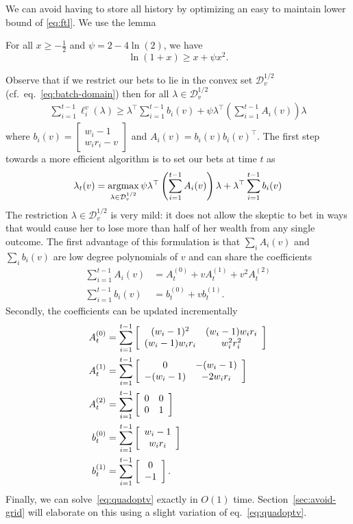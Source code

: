We can avoid having to store all history by optimizing an easy to maintain
lower bound of \eqref{eq:ftl}.  We use the lemma
\begin{lemma} 
\label{lem:quadbound}
For all $x\geq -\frac{1}{2}$ and $\psi=2-4\ln(2)$, we have
\[
\ln(1+x)\geq x + \psi x^2.
\]
\end{lemma}
Observe that if we restrict our bets to lie in the convex set
$\mathcal{D}_v^{1/2}$ (cf.~eq.~\eqref{eq:batch-domain}) then for all $\lambda
\in \mathcal{D}_v^{1/2}$
\begin{align*}
\sum_{i=1}^{t-1} \ell_i^v(\lambda) 
\geq
\lambda^\top \sum_{i=1}^{t-1} b_i(v) 
+\psi \lambda^\top \left(\sum_{i=1}^{t-1} A_i(v)\right) \lambda
\end{align*}
where 
$b_i(v)=
\left[\begin{array}{c} 
w_i-1 \\ w_i r_i -v 
\end{array}\right] 
$
and 
$
A_i(v) = b_i(v)b_i(v)^\top.
$
The first step towards a more efficient algorithm is to set our bets at time
$t$ as
\begin{equation}
\lambda_t(v) = \operatorname*{argmax}_{\lambda \in \mathcal{D}_{v}^{1/2}}
\psi  \lambda^\top \left(\sum_{i=1}^{t-1} A_i(v)\right) \lambda 
+ \lambda^\top \sum_{i=1}^{t-1} b_i(v)
\label{eq:quadoptv}
\end{equation}
The restriction $\lambda \in \mathcal{D}_{v}^{1/2}$ is very mild: it does not
allow the skeptic to bet in ways that would cause her to lose more than half of
her wealth from any single outcome.  The first advantage of this formulation is
that $\sum_i A_i(v)$ and $\sum_i b_i(v)$ are low degree polynomials of $v$ and
can share the coefficients
    \begin{align*}
        \sum_{i=1}^{t-1} A_i(v) &= 
        A_t^{(0)} + v A_t^{(1)} + v^2 A_t^{(2)}\\   
        \sum_{i=1}^{t-1} b_i(v) &= b_t^{(0)} + v b_t^{(1)}.  
    \end{align*}
Secondly, the coefficients can be updated incrementally
    \begin{align}
        A_t^{(0)} &=\sum_{i=1}^{t-1}\left[\begin{array}{cc} (w_i-1)^2 & (w_i-1)w_i r_i \\ (w_i-1)w_i r_i & w_i^2r_i^2 \end{array}\right] \label{eq:upsuffa0}\\
        A_t^{(1)} &= \sum_{i=1}^{t-1} \left[\begin{array}{cc} 0 & -(w_i-1) \\ -(w_i-1) & -2w_ir_i \end{array}\right]\\
        A_t^{(2)} &=\sum_{i=1}^{t-1}  \left[\begin{array}{cc} 0 & 0 \\ 0 & 1 \end{array}\right]\\
        b_t^{(0)} &=\sum_{i=1}^{t-1}  \left[\begin{array}{c} w_i-1 \\ w_ir_i \end{array}\right]\\
        b_t^{(1)} &=\sum_{i=1}^{t-1}  \left[\begin{array}{c} 0 \\ -1 \end{array}\right]. \label{eq:upsuffb1}
    \end{align}
Finally, we can solve~\eqref{eq:quadoptv} exactly in $O(1)$ time.
Section~\ref{sec:avoid-grid} will elaborate on this using a slight variation of
eq.~\eqref{eq:quadoptv}.

